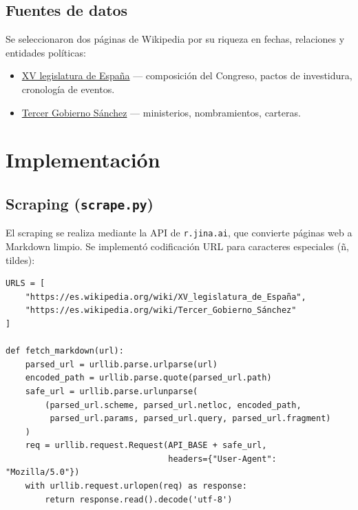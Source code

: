 \documentclass[12pt,a4paper]{article}
\begin{document}
\subsection{Fuentes de datos}

Se seleccionaron dos páginas de Wikipedia por su riqueza en fechas, relaciones y entidades políticas:

\begin{itemize}
  \item \href{https://es.wikipedia.org/wiki/XV_legislatura_de_Espa%C3%B1a}{XV legislatura de España} --- composición del Congreso, pactos de investidura, cronología de eventos.
  \item \href{https://es.wikipedia.org/wiki/Tercer_Gobierno_S%C3%A1nchez}{Tercer Gobierno Sánchez} --- ministerios, nombramientos, carteras.
\end{itemize}

\section{Implementación}
\label{sec:implementacion}

\subsection{Scraping (\texttt{scrape.py})}

El scraping se realiza mediante la API de \texttt{r.jina.ai}, que convierte páginas web a Markdown limpio. Se implementó codificación URL para caracteres especiales (ñ, tildes):

\begin{lstlisting}[caption={scrape.py --- extracción de contenido a Markdown}, label={lst:scrape}]
URLS = [
    "https://es.wikipedia.org/wiki/XV_legislatura_de_España",
    "https://es.wikipedia.org/wiki/Tercer_Gobierno_Sánchez"
]

def fetch_markdown(url):
    parsed_url = urllib.parse.urlparse(url)
    encoded_path = urllib.parse.quote(parsed_url.path)
    safe_url = urllib.parse.urlunparse(
        (parsed_url.scheme, parsed_url.netloc, encoded_path,
         parsed_url.params, parsed_url.query, parsed_url.fragment)
    )
    req = urllib.request.Request(API_BASE + safe_url,
                                 headers={"User-Agent": "Mozilla/5.0"})
    with urllib.request.urlopen(req) as response:
        return response.read().decode('utf-8')
\end{lstlisting}
\end{document}
